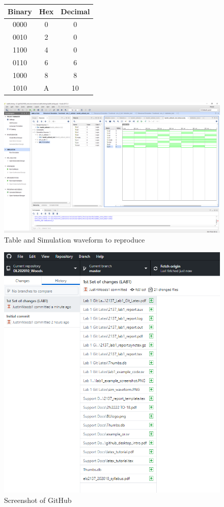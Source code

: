 \documentclass[11pt]{article}
\begin{document}
\begin{figure}[ht]\centering 
	
	\begin{tabular}{c|c|c}
		\toprule
		Binary & Hex & Decimal \\
		\midrule
		0000   & 0 & 0 \\
		0010   & 2 & 0 \\
		1100   & 4 & 0 \\
		0110   & 6 & 6 \\ 
		1000   & 8 & 8 \\
		1010   & A & 10 \\
		\bottomrule	
	\end{tabular}  

		\includegraphics[width=\textwidth, trim=550 450 15 130, clip] {lab1_example_screenshot}
		\caption{Table and Simulation waveform to reproduce}
		\label{fig:sim_with_table}
	\end{figure} 
 
	\begin{figure}\centering
		\includegraphics[width=\textwidth]{Capture}
		\caption{Screenshot of GitHub}
		\label{fig:sim_with_table}
	\end{figure}
\end{document}
